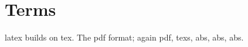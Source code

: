 \documentclass{article}
\begin{document}
\section{Terms}
\Gls{latex} builds on \gls{tex}. The \gls{pdf} format; again \gls{pdf}, \glspl{tex}, \gls{abs}, \acrshort{abs}, \acrlong{abs}.
\printglossary[type=main]\printglossary[type=\acronymtype]
\end{document}
